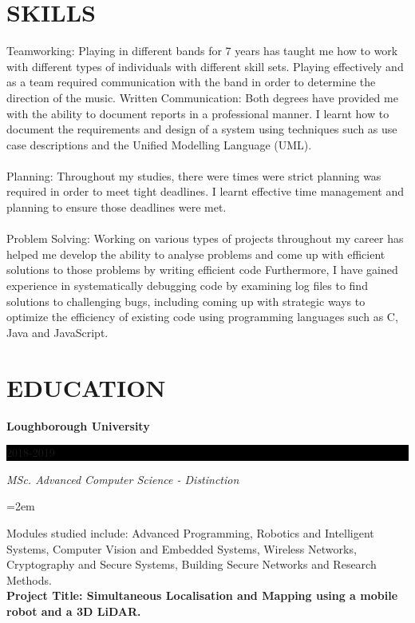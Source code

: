 \documentclass[paper=a4,fontsize=11pt]{scrartcl} %
\newcommand{\sepspace}{\vspace*{1em}}       %
\newcommand{\NewPart}[1]{\section*{\uppercase{#1}}}
\newcommand{\EducationEntry}[4]{
        \noindent \textbf{#1} \hfill      %
        \colorbox{Black}{%
            \parbox{6em}{%
            \hfill\color{White}#2}} \par  %
        \noindent \textit{#3} \par        %
        \noindent\hangindent=2em\hangafter=0 \small #4 %
        \normalsize \par}
\begin{document}
\newpage
\NewPart{Skills}{}

Teamworking: Playing in different bands for 7 years has taught me how to work with
different types of individuals with different skill sets. Playing effectively and as a team
required communication with the band in order to determine the direction of the music.
Written Communication: Both degrees have provided me with the ability to document
reports in a professional manner. I learnt how to document the requirements and design
of a system using techniques such as use case descriptions and the Unified Modelling
Language (UML).\\\\
Planning: Throughout my studies, there were times were strict planning was required in
order to meet tight deadlines. I learnt effective time management and planning to ensure
those deadlines were met.\\\\
Problem Solving: Working on various types of projects throughout my career has helped me develop the ability to analyse problems and come up with efficient solutions to those problems by writing efficient code Furthermore, I have gained experience in systematically debugging code by examining log files to find solutions to challenging bugs, including coming up with strategic ways to optimize the efficiency of existing code using programming languages such as C, Java and JavaScript.  

\NewPart{Education}{}

\EducationEntry{Loughborough University}{2018-2019}{MSc. Advanced Computer Science - Distinction}{}{\noindent \small Modules studied include: Advanced Programming, Robotics and Intelligent Systems, Computer
	Vision and Embedded Systems, Wireless Networks, Cryptography and Secure Systems, Building
	Secure Networks and Research Methods. \\
	\textbf{\footnotesize Project Title: Simultaneous Localisation and Mapping using a mobile robot and a 3D LiDAR.}}
\sepspace
\end{document}
